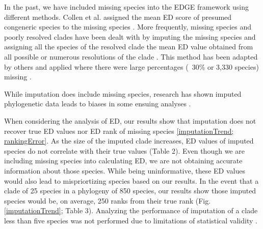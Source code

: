 \documentclass[12pt,english]{article}
\begin{document}

In the past, we have included missing species into the EDGE framework using
different methods. Collen et al. assigned the mean ED score of presumed
congeneric species to the missing species \citeyear{Collen2011}. More
frequently, missing species and poorly resolved clades have been dealt with by
imputing the missing species and assigning all the species of the resolved clade
the mean ED value obtained from all possible or numerous resolutions of the
clade \autocite{Isaac2007; Isaac2012}. This method has been adapted by others
and applied where there were large percentages (~30\% or 3,330 species) missing
\autocite{Jetz2014}. 

While imputation does include missing species, research has
shown imputed phylogenetic data leads to biases in some ensuing analyses
\autocite{Rabosky2014}.

When considering the analysis of ED, our results show that imputation does not
recover true ED values nor ED rank of missing species \ref{imputationTrend;
rankingError}. As the size of the imputed clade increases, ED values of imputed
species do not correlate with their true values (Table 2). Even though we are
including missing species into calculating ED, we are not obtaining accurate
information about those species. While being uninformative, these ED values
would also lead to mispriortizing species based on our results. In the event
that a clade of 25 species in a phylogeny of 850 species, our results show those
imputed species would be, on average, 250 ranks from their true rank (Fig.
\ref{imputationTrend}; Table 3).
Analyzing the performance of imputation of a clade less than five
species was not performed due to limitations of statistical validity
\autocite{Crawley2012}.
\end{document}
